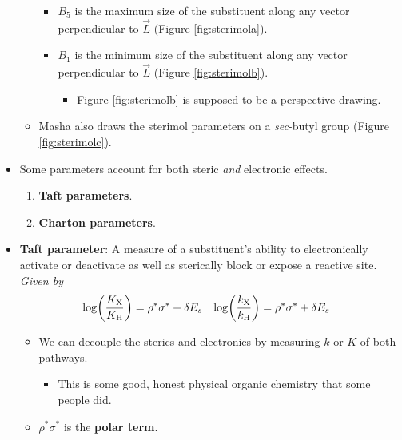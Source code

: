 \documentclass[../notes.tex]{subfiles}
\begin{document}
\begin{itemize}
\begin{itemize}
\begin{itemize}
            \item $B_5$ is the maximum size of the substituent along any vector perpendicular to $\vec{L}$ (Figure \ref{fig:sterimola}).
            \item $B_1$ is the minimum size of the substituent along any vector perpendicular to $\vec{L}$ (Figure \ref{fig:sterimolb}).
            \begin{itemize}
                \item Figure \ref{fig:sterimolb} is supposed to be a perspective drawing.
            \end{itemize}
        \end{itemize}
        \item Masha also draws the sterimol parameters on a \emph{sec}-butyl group (Figure \ref{fig:sterimolc}).
    \end{itemize}
    \item Some parameters account for both steric \emph{and} electronic effects.
    \begin{enumerate}
        \item \textbf{Taft parameters}.
        \item \textbf{Charton parameters}.
    \end{enumerate}
    \item \textbf{Taft parameter}: A measure of a substituent's ability to electronically activate or deactivate as well as sterically block or expose a reactive site. \emph{Given by}
    \begin{align*}
        \log(\frac{K_{\ce{X}}}{K_{\ce{H}}}) &= \rho^*\sigma^*+\delta E_s&
        \log(\frac{k_{\ce{X}}}{k_{\ce{H}}}) &= \rho^*\sigma^*+\delta E_s
    \end{align*}
    \begin{itemize}
        \item We can decouple the sterics and electronics by measuring $k$ or $K$ of both pathways.
        \begin{itemize}
            \item This is some good, honest physical organic chemistry that some people did.
        \end{itemize}
        \item $\rho^*\sigma^*$ is the \textbf{polar term}.

\end{itemize}
\end{itemize}
\end{document}
